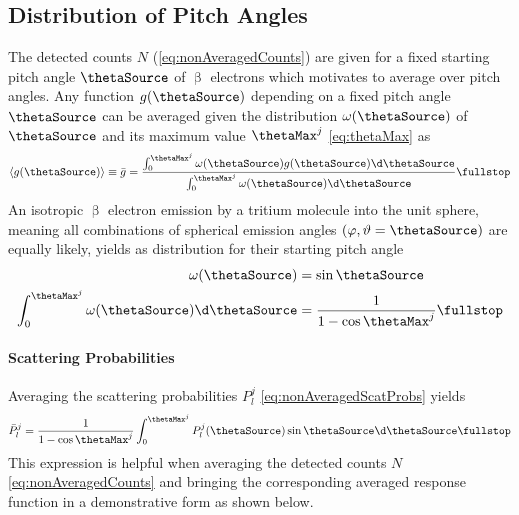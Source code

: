 \subsection{Distribution of Pitch Angles}
\label{sec:pitchAngleAveraging}
The detected counts $N$ (\ref{eq:nonAveragedCounts}) are given for a fixed starting pitch angle $\thetaSource$ of $\upbeta$ electrons which motivates to average over pitch angles. Any function $g(\thetaSource)$ depending on a fixed pitch angle $\thetaSource$ can be averaged given the distribution $\omega(\thetaSource)$ of $\thetaSource$ and its maximum value $\thetaMax^j$ \eqref{eq:thetaMax} as
\begin{equation}
    \label{eq:pitchAngleAveraging}
    \langle g(\thetaSource) \rangle \equiv \bar{g} =  
    \frac{
        \int_{0}^{\thetaMax^j} 
            \omega(\thetaSource)
            g(\thetaSource)
        \d \thetaSource   
    }{
        \int_{0}^{\thetaMax^j} 
            \omega(\thetaSource)
        \d \thetaSource 
    } \fullstop
\end{equation}
An isotropic $\upbeta$ electron emission by a tritium molecule into the unit sphere, meaning all combinations of spherical emission angles $(\varphi, \vartheta=\thetaSource)$ are equally likely, yields as distribution for their starting pitch angle
\begin{align}
    \omega(\thetaSource) &= \sin\thetaSource \\
    \int_{0}^{\thetaMax^j} 
            \omega(\thetaSource)
        \d \thetaSource 
    &= \frac{1}{1-\cos\thetaMax^j}
    \fullstop
\end{align}

\paragraph{Scattering Probabilities}
Averaging the scattering probabilities $P_l^j$ \eqref{eq:nonAveragedScatProbs} yields
\begin{equation}
    \label{eq:averagedScatProbs}
        \bar{P}_l^j = \frac{1}{1-\cos\thetaMax^j} \int_{0}^{\thetaMax^j} P_l^j(\thetaSource) \sin\thetaSource \d \thetaSource \fullstop
\end{equation}
This expression is helpful when averaging the detected counts $N$ \eqref{eq:nonAveragedCounts} and bringing the corresponding averaged response function in a demonstrative form as shown below.

